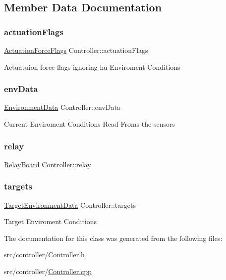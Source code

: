 \subsection{Member Data Documentation}
\mbox{\label{classController_adb38d16eaea1f98887b3c1fc75ab5bd3}} 
\subsubsection{\texorpdfstring{actuation\+Flags}{actuationFlags}}
{\footnotesize\ttfamily \hyperlink{structActuationForceFlags}{Actuation\+Force\+Flags} Controller\+::actuation\+Flags\hspace{0.3cm}{\ttfamily [private]}}

Actuatuion force flags ignoring hu Enviroment Conditions \mbox{\label{classController_ac99088334f56588243867ca1c18f9633}} 
\subsubsection{\texorpdfstring{env\+Data}{envData}}
{\footnotesize\ttfamily \hyperlink{structEnvironmentData}{Environment\+Data} Controller\+::env\+Data\hspace{0.3cm}{\ttfamily [private]}}

Current Enviroment Conditions Read Froms the sensors \mbox{\label{classController_aa3f1d7aae706a5440adf520cbd7fb216}} 
\subsubsection{\texorpdfstring{relay}{relay}}
{\footnotesize\ttfamily \hyperlink{classRelayBoard}{Relay\+Board} Controller\+::relay\hspace{0.3cm}{\ttfamily [private]}}

\mbox{\label{classController_a8f2fb8295fd3da6ebc8bdb0f25036322}} 
\subsubsection{\texorpdfstring{targets}{targets}}
{\footnotesize\ttfamily \hyperlink{structTargetEnvironmentData}{Target\+Environment\+Data} Controller\+::targets\hspace{0.3cm}{\ttfamily [private]}}

Target Enviroment Conditions 

The documentation for this class was generated from the following files\+:\begin{DoxyCompactItemize}
\item 
src/controller/\hyperlink{Controller_8h}{Controller.\+h}\item 
src/controller/\hyperlink{Controller_8cpp}{Controller.\+cpp}\end{DoxyCompactItemize}
